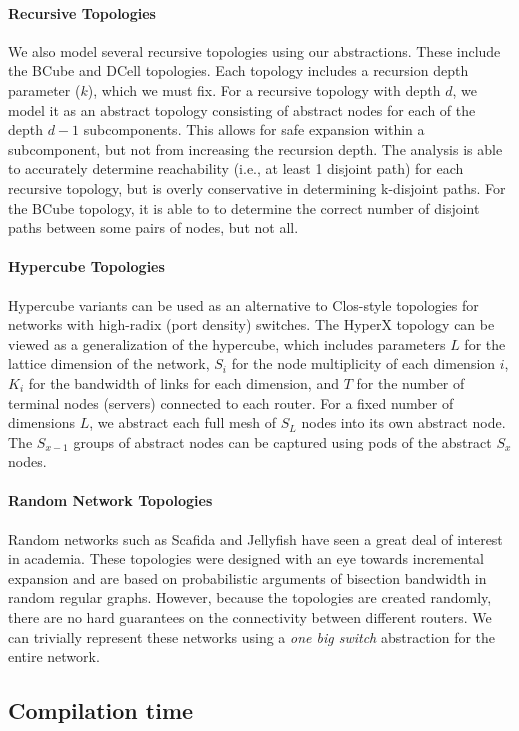 \documentclass{sig-alternate-10pt}
\newcommand{\para}[1]{\paragraph*{\textbf{#1}}}
\begin{document}
\para{Recursive Topologies}

We also model several recursive topologies using our abstractions. These include the BCube and DCell topologies. Each topology includes a recursion depth parameter ($k$), which we must fix. For a recursive topology with depth $d$, we model it as an abstract topology consisting of abstract nodes for each of the depth $d-1$ subcomponents. This allows for safe expansion within a subcomponent, but not from increasing the recursion depth. The analysis is able to accurately determine reachability (i.e., at least 1 disjoint path) for each recursive topology, but is overly conservative in determining k-disjoint paths. For the BCube topology, it is able to to determine the correct number of disjoint paths between some pairs of nodes, but not all.

\para{Hypercube Topologies}

Hypercube variants can be used as an alternative to Clos-style topologies for networks with high-radix (port density) switches. The HyperX topology can be viewed as a generalization of the hypercube, which includes parameters $L$ for the lattice dimension of the network, $S_i$ for the node multiplicity of each dimension $i$, $K_i$ for the bandwidth of links for each dimension, and $T$ for the number of terminal nodes (servers) connected to each router. For a fixed number of dimensions $L$, we abstract each full mesh of $S_L$ nodes into its own abstract node. The $S_{x-1}$ groups of abstract nodes can be captured using pods of the abstract $S_x$ nodes.

\para{Random Network Topologies}

Random networks such as Scafida and Jellyfish have seen a great deal of interest in academia. These topologies were designed with an eye towards incremental expansion and are based on probabilistic arguments of bisection bandwidth in random regular graphs. However, because the topologies are created randomly, there are no hard guarantees on the connectivity between different routers. We can trivially represent these networks using a \emph{one big switch} abstraction for the entire network.


\subsection{Compilation time}
\end{document}
